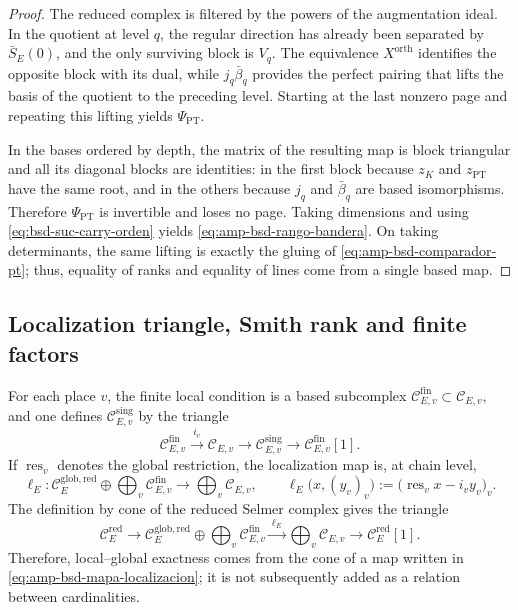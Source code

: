 \begin{proof}
The reduced complex is filtered by the powers of the augmentation ideal. In the
quotient at level \(q\), the regular direction has already been separated by
\(\bar S_E(0)\), and the only surviving block is \(V_q\). The equivalence
\(X^{\mathrm{orth}}\) identifies the opposite block with its dual, while
\(j_q\bar\beta_q\) provides the perfect pairing that lifts the
basis of the quotient to the preceding level. Starting at the last nonzero page and
repeating this lifting yields \(\Psi_{\mathrm{PT}}\).

In the bases ordered by depth, the matrix of the resulting map is
block triangular and all its diagonal blocks are identities: in the
first block because \(z_K\) and \(z_{\mathrm{PT}}\) have the same root, and
in the others because \(j_q\) and \(\bar\beta_q\) are based isomorphisms.
Therefore \(\Psi_{\mathrm{PT}}\) is invertible and loses no page.
Taking dimensions and using
\eqref{eq:bsd-suc-carry-orden} yields
\eqref{eq:amp-bsd-rango-bandera}. On taking determinants, the same
lifting is exactly the gluing of
\eqref{eq:amp-bsd-comparador-pt}; thus, equality of ranks and equality of
lines come from a single based map.
\end{proof}

\subsection{Localization triangle, Smith rank and finite factors}
\label{subsec:amp-bsd-smith-sha}

For each place \(v\), the finite local condition is a based subcomplex
\(\mathcal C_{E,v}^{\mathrm{fin}}\subset\mathcal C_{E,v}\), and one defines
\(\mathcal C_{E,v}^{\mathrm{sing}}\) by the triangle
\begin{equation}\label{eq:amp-bsd-triangulo-local}
 \mathcal C_{E,v}^{\mathrm{fin}}
 \xrightarrow{\ i_v\ }\mathcal C_{E,v}
 \longrightarrow\mathcal C_{E,v}^{\mathrm{sing}}
 \longrightarrow\mathcal C_{E,v}^{\mathrm{fin}}[1].
\end{equation}
If \(\operatorname{res}_v\) denotes the global restriction, the localization
map is, at chain level,
\begin{equation}\label{eq:amp-bsd-mapa-localizacion}
 \ell_E:
 \mathcal C_E^{\mathrm{glob,red}}\oplus
 \bigoplus_v\mathcal C_{E,v}^{\mathrm{fin}}
 \longrightarrow\bigoplus_v\mathcal C_{E,v},
 \qquad
 \ell_E\bigl(x,(y_v)_v\bigr)
 :=\bigl(\operatorname{res}_v x-i_vy_v\bigr)_v .
\end{equation}
The definition by cone of the reduced Selmer complex gives the triangle
\begin{equation}\label{eq:amp-bsd-triangulo-localizacion}
 \mathcal C_E^{\mathrm{red}}
 \longrightarrow
 \mathcal C_E^{\mathrm{glob,red}}\oplus
 \bigoplus_v\mathcal C_{E,v}^{\mathrm{fin}}
 \xrightarrow{\ \ell_E\ }
 \bigoplus_v\mathcal C_{E,v}
 \longrightarrow\mathcal C_E^{\mathrm{red}}[1].
\end{equation}
Therefore, local--global exactness comes from the cone of a map written in
\eqref{eq:amp-bsd-mapa-localizacion}; it is not subsequently added as a relation
between cardinalities.

